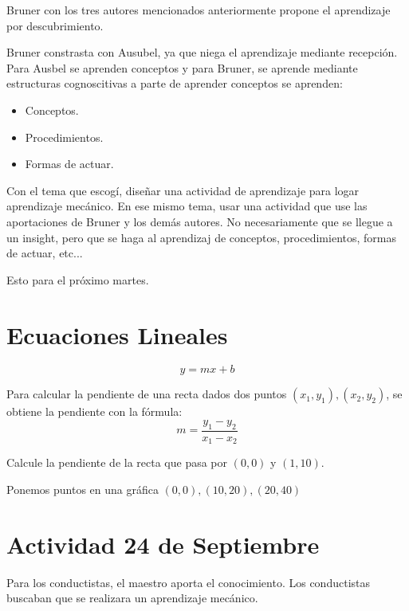 \documentclass[12pt]{report}
\theoremstyle{largebreak}
\begin{document}
    Bruner con los tres autores mencionados anteriormente propone el aprendizaje por descubrimiento.

    Bruner constrasta con Ausubel, ya que niega el aprendizaje mediante recepción. Para Ausbel se aprenden conceptos y para Bruner, se aprende mediante estructuras cognoscitivas a parte de aprender conceptos se aprenden:
    \begin{itemize}
        \item Conceptos.
        \item Procedimientos.
        \item Formas de actuar.
    \end{itemize}

    \begin{excer}
        Con el tema que escogí, diseñar una actividad de aprendizaje para logar aprendizaje mecánico. En ese mismo tema, usar una actividad que use las aportaciones de Bruner y los demás autores. No necesariamente que se llegue a un insight, pero que se haga al aprendizaj de conceptos, procedimientos, formas de actuar, etc...

        Esto para el próximo martes.
    \end{excer}

    \section{Ecuaciones Lineales}

    \begin{equation*}
        y=mx+b
    \end{equation*}

    Para calcular la pendiente de una recta dados dos puntos $(x_1,y_1),(x_2,y_2)$, se obtiene la pendiente con la fórmula:
    \begin{equation*}
        m=\frac{y_1-y_2}{x_1-x_2}
    \end{equation*}
    \begin{excer}
        Calcule la pendiente de la recta que pasa por $(0,0)$ y $(1,10)$.
    \end{excer}

    Ponemos puntos en una gráfica $(0,0),(10, 20),(20,40)$

    \section{Actividad 24 de Septiembre}

    Para los conductistas, el maestro aporta el conocimiento. Los conductistas buscaban que se realizara un aprendizaje mecánico.
\end{document}
